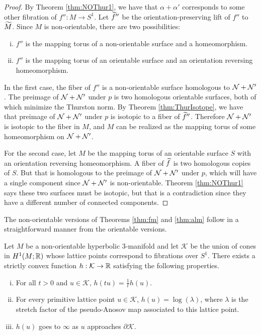 \begin{proof}
  By Theorem \ref{thm:NOThur1}, we have that $\alpha + \alpha'$ corresponds to some other fibration
  of $f'':M\rightarrow S^1$. Let $\widetilde{f}''$ be the orientation-preserving lift of $f''$ to $\widetilde{M}$.  Since $M$ is non-orientable, there are two possibilities:
  \begin{enumerate}[(i)]
  \item $f''$ is the mapping torus of a non-orientable surface and a homeomorphism.
  \item $f''$ is the mapping torus of an orientable surface and an orientation
    reversing homeomorphism.
  \end{enumerate}
  In the first case, the fiber of $f''$ is a non-orientable surface homologous to $\mathcal{N} + \mathcal{N}'$. The preimage of $\mathcal{N}+\mathcal{N}'$ under $p$ is two homologous orientable surfaces, both of which minimize the Thurston norm. By
  Theorem \ref{thm:ThurIsotope}, we have that preimage of $\mathcal{N} + \mathcal{N}'$ under $p$ is isotopic to a fiber of $\widetilde{f}''$.   Therefore $\mathcal{N} + \mathcal{N}'$ is isotopic to the fiber in $M$, and $M$ can be realized as the mapping torus of some
  homeomorphism on $\mathcal{N} + \mathcal{N}'$.

  For the second case, let $M$ be the mapping
  torus of an orientable surface $S$ with an orientation reversing homeomorphism.  A fiber of $\widetilde{f}$ is two homologous copies of $S$. But
  that is homologous to the preimage of $\mathcal{N} + \mathcal{N}'$ under $p$, which will have a single component since
  $\mathcal{N} + \mathcal{N}'$ is non-orientable. Theorem \ref{thm:NOThur1} says these two surfaces must be
  isotopic, but that is a contradiction since they have a different number of connected components.
\end{proof}

The non-orientable versions of Theorems \ref{thm:fm} and \ref{thm:alm} follow in a straightforward
manner from the orientable versions.

\begin{thm}
  \label{thm:NOfm}
  Let $M$ be a non-orientable hyperbolic $3$-manifold and let $\mathcal{K}$ be the union of cones
  in $H^1(M; \mathbb{R})$ whose lattice points correspond to fibrations over $S^1$. There exists a
  strictly convex function $h: \mathcal{K} \to \mathbb{R}$ satisfying the following properties.
  \begin{enumerate}[(i)]
  \item For all $t > 0$ and $u \in \mathcal{K}$, $h(tu) = \frac{1}{t} h(u)$.
  \item For every primitive lattice point $u \in \mathcal{K}$, $h(u) = \log(\lambda)$, where $\lambda$ is
    the stretch factor of the pseudo-Anosov map associated to this lattice point.
  \item $h(u)$ goes to $\infty$ as $u$ approaches $\partial \mathcal{K}$.
  \end{enumerate}
\end{thm}

